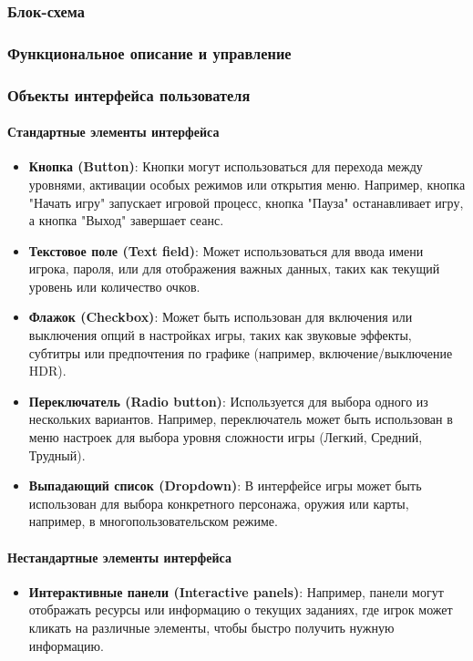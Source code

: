 \documentclass{article}
\begin{document}
\begin{itemize}
\subsubsection{Блок-схема}

\subsubsection{Функциональное описание и управление}

\subsubsection{Объекты интерфейса пользователя}

\paragraph{Стандартные элементы интерфейса}
\begin{itemize}
    \item \textbf{Кнопка (Button)}: Кнопки могут использоваться для перехода между уровнями, активации особых режимов или открытия меню. Например, кнопка "Начать игру" запускает игровой процесс, кнопка "Пауза" останавливает игру, а кнопка "Выход" завершает сеанс.
    
    \item \textbf{Текстовое поле (Text field)}: Может использоваться для ввода имени игрока, пароля, или для отображения важных данных, таких как текущий уровень или количество очков.
    
    \item \textbf{Флажок (Checkbox)}: Может быть использован для включения или выключения опций в настройках игры, таких как звуковые эффекты, субтитры или предпочтения по графике (например, включение/выключение HDR).
    
    \item \textbf{Переключатель (Radio button)}: Используется для выбора одного из нескольких вариантов. Например, переключатель может быть использован в меню настроек для выбора уровня сложности игры (Легкий, Средний, Трудный).
    
    \item \textbf{Выпадающий список (Dropdown)}: В интерфейсе игры может быть использован для выбора конкретного персонажа, оружия или карты, например, в многопользовательском режиме.
\end{itemize}

\paragraph{Нестандартные элементы интерфейса}
\begin{itemize}
    \item \textbf{Интерактивные панели (Interactive panels)}: Например, панели могут отображать ресурсы или информацию о текущих заданиях, где игрок может кликать на различные элементы, чтобы быстро получить нужную информацию.
    

\end{itemize}
\end{itemize}
\end{document}
